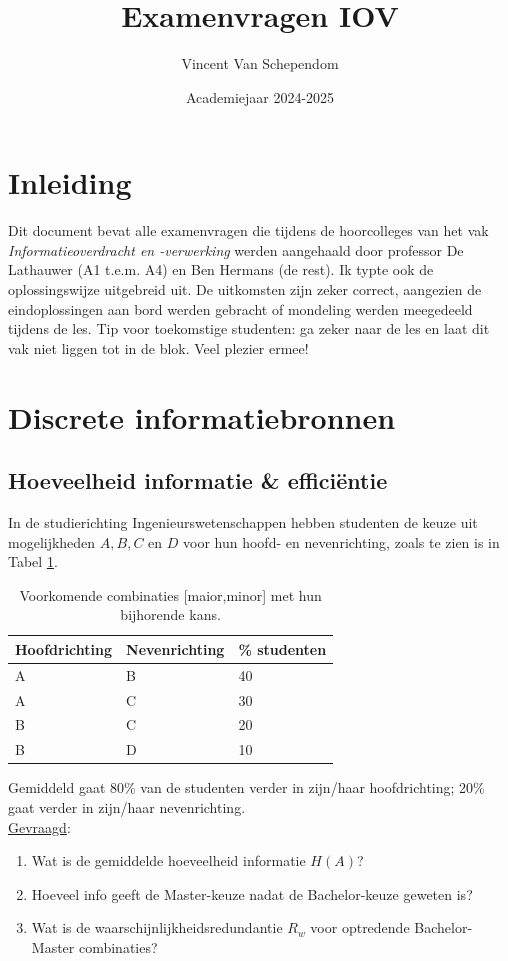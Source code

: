 \documentclass[kulak]{kulakarticle}
\title{Examenvragen IOV}
\author{Vincent Van Schependom}
\date{Academiejaar 2024-2025}
\begin{document}
	\maketitle

	\section*{Inleiding}

	Dit document bevat alle examenvragen die tijdens de hoorcolleges van het vak \textit{Informatieoverdracht en -verwerking} werden aangehaald door professor De Lathauwer (A1 t.e.m. A4) en Ben Hermans (de rest). Ik typte ook de oplossingswijze uitgebreid uit. De uitkomsten zijn zeker correct, aangezien de eindoplossingen aan bord werden gebracht of mondeling werden meegedeeld tijdens de les. Tip voor toekomstige studenten: ga zeker naar de les en laat dit vak niet liggen tot in de blok. Veel plezier ermee!

	\section{Discrete informatiebronnen}

	\subsection{Hoeveelheid informatie \& efficiëntie}

	In de studierichting Ingenieurswetenschappen hebben studenten de keuze uit mogelijkheden \(A, B, C\) en \(D\) voor hun hoofd- en nevenrichting, zoals te zien is in Tabel \ref{tab:mogelijkheden}.

	\begin{table}[h!]
		\centering
		\begin{tabular}{l | l | l}
		Hoofdrichting & Nevenrichting & \% studenten \\ \hline
		A & B & 40 \\
		A & C & 30 \\
		B & C & 20 \\
		B & D & 10
		\end{tabular}
		\caption{Voorkomende combinaties [maior,minor] met hun bijhorende kans.}
		\label{tab:mogelijkheden}
	\end{table}

	Gemiddeld gaat 80\% van de studenten verder in zijn/haar hoofdrichting; 20\% gaat verder in zijn/haar nevenrichting.\\

	\underline{Gevraagd}:
	\begin{enumerate}
		\item Wat is de gemiddelde hoeveelheid informatie \(H(A)\)?
		\item Hoeveel info geeft de Master-keuze nadat de Bachelor-keuze geweten is?
		\item Wat is de waarschijnlijkheidsredundantie \(R_w\) voor optredende Bachelor-Master combinaties?
	\end{enumerate}
\end{document}
